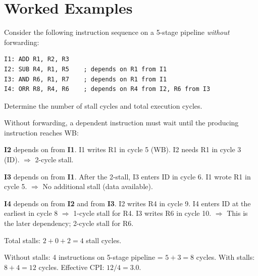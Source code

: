 \section{Worked Examples}
\label{sec:arch:examples}

\begin{example}
Consider the following instruction sequence on a 5-stage pipeline \emph{without} forwarding:
\begin{lstlisting}[style=ARM, numbers=none]
I1: ADD R1, R2, R3
I2: SUB R4, R1, R5    ; depends on R1 from I1
I3: AND R6, R1, R7    ; depends on R1 from I1
I4: ORR R8, R4, R6    ; depends on R4 from I2, R6 from I3
\end{lstlisting}
Determine the number of stall cycles and total execution cycles.

\begin{solution}
Without forwarding, a dependent instruction must wait until the producing instruction reaches WB:

\textbf{I2} depends on  from \textbf{I1}. I1 writes R1 in cycle 5 (WB). I2 needs R1 in cycle 3 (ID). $\Rightarrow$ 2-cycle stall.

\textbf{I3} depends on  from \textbf{I1}. After the 2-stall, I3 enters ID in cycle 6. I1 wrote R1 in cycle 5. $\Rightarrow$ No additional stall (data available).

\textbf{I4} depends on  from \textbf{I2} and  from \textbf{I3}. I2 writes R4 in cycle 9. I4 enters ID at the earliest in cycle 8 $\Rightarrow$ 1-cycle stall for R4. I3 writes R6 in cycle 10. $\Rightarrow$ This is the later dependency; 2-cycle stall for R6.

Total stalls: $2 + 0 + 2 = 4$ stall cycles.

Without stalls: 4 instructions on 5-stage pipeline = $5 + 3 = 8$ cycles.
With stalls: $8 + 4 = 12$ cycles.
Effective CPI: $12/4 = 3.0$.
\end{solution}
\end{example}

